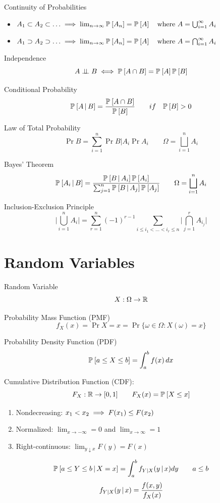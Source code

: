 \documentclass[landscape]{article}
\begin{document}
\begin{multicols*}{2}
Continuity of Probabilities
\begin{itemize}
  \item $A_1 \subset A_2 \subset \dots \;\Longrightarrow\; \lim_{n\to \infty} \mathbb{P}_{}\left[A_n\right] = \mathbb{P}_{}\left[A\right]
    \quad\text{where } A = \bigcup_{i=1}^\infty A_i$
  \item $A_1 \supset A_2 \supset \dots \;\Longrightarrow\; \lim_{n\to \infty} \mathbb{P}_{}\left[A_n\right] = \mathbb{P}_{}\left[A\right]
    \quad\text{where } A = \bigcap_{i=1}^\infty A_i$
\end{itemize}

Independence \ind
$$A \perp\!\!\!\perp B \;\Longleftrightarrow\; \mathbb{P}_{}\left[A \cap B\right] = \mathbb{P}_{}\left[A\right]\mathbb{P}_{}\left[B\right]$$

Conditional Probability
$$\mathbb{P}_{}\left[A \,|\, B\right] = \frac{\mathbb{P}_{}\left[A \cap B\right]}{\mathbb{P}_{}\left[B\right]} \qquad if \quad \mathbb{P}_{}\left[B\right] > 0$$

Law of Total Probability
$$ \Pr{B} = \sum_{i=1}^n \Pr{B|A_i}\Pr{A_i}
  \qquad \Omega = \bigsqcup_{i=1}^n A_i$$ 

Bayes' Theorem
$$\mathbb{P}_{}\left[A_i \,|\, B\right] 
= \frac{\mathbb{P}_{}\left[B \,|\, A_i\right]\mathbb{P}_{}\left[A_i\right]}{\sum_{j=1}^n \mathbb{P}_{}\left[B \,|\, A_j\right]\mathbb{P}_{}\left[A_j\right]} 
\qquad \Omega = \bigsqcup_{i=1}^n A_i$$

Inclusion-Exclusion Principle
$$\biggl|\bigcup_{i=1}^n A_i\biggr| = \sum_{r=1}^n(-1)^{r-1}
  \sum_{i \le i_1 < \dots < i_r \le n}\biggl|\bigcap_{j=1}^r A_{i_j}\biggr|$$

\section{Random Variables}

Random Variable
$$X: \Omega \to \mathbb{R}$$

Probability Mass Function (PMF)
$$f_X(x) = \Pr{X = x} = \Pr{\{\omega\in\Omega:X(\omega) = x\}}$$

Probability Density Function (PDF)
$$\mathbb{P}_{}\left[a \le X \le b\right] = \int_a^b f(x)\,dx$$

Cumulative Distribution Function (CDF): 
$$F_X:\mathbb{R} \to [0,1] \qquad F_X(x) = \mathbb{P}_{}\left[X \le x\right]$$

\begin{enumerate}
  \item Nondecreasing: $x_1 < x_2 \;\Longrightarrow\; F(x_1) \le F(x_2)$
  \item Normalized: $\lim_{x\to -\infty} = 0$ and $\lim_{x\to \infty} = 1$
  \item Right-continuous: $\lim_{y\downarrow x} F(y) = F(x)$
\end{enumerate}

$$\mathbb{P}_{}\left[a\le Y\le b \,|\, X=x\right] = \int_a^b f_{Y|X}(y\,|\, x) dy \qquad a \le b$$
$$ f_{Y|X}(y\,|\, x) = \frac{f(x,y)}{f_X(x)} $$


\end{multicols*}
\end{document}
